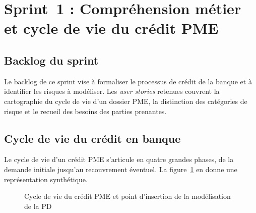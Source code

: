 \documentclass[a4paper,12pt,oneside]{report}
\begin{document}
\section{Sprint~1 : Compréhension métier et cycle de vie du crédit PME}

\subsection{Backlog du sprint}

Le backlog de ce sprint vise à formaliser le processus de crédit de la banque et à identifier
les risques à modéliser. Les \textit{user stories} retenues couvrent la cartographie du cycle
de vie d'un dossier PME, la distinction des catégories de risque et le recueil des besoins des
parties prenantes.

\subsection{Cycle de vie du crédit en banque}

Le cycle de vie d'un crédit PME s'articule en quatre grandes phases, de la demande initiale
jusqu'au recouvrement éventuel. La figure~\ref{fig:cycle_credit} en donne une représentation
synthétique.

\begin{figure}[H]
  \centering
  \caption{Cycle de vie du crédit PME et point d'insertion de la modélisation de la PD}
  \label{fig:cycle_credit}
\end{figure}
\end{document}
